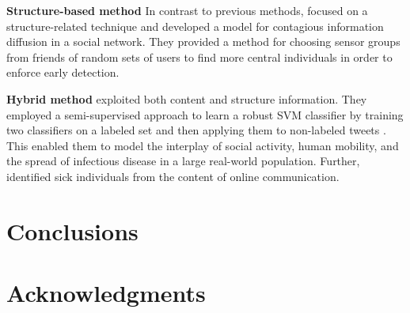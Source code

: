 \documentclass{acm_proc_article-sp}
\begin{document}
\begin{itemize}
\textbf{Structure-based method} In contrast to previous methods, \cite{garcia} focused on a structure-related technique and developed a model for contagious information diffusion in a social network. They provided a method for choosing sensor groups from friends of random sets of users to find more central individuals in order to enforce early detection.

\textbf{Hybrid method} \cite{sadilek} exploited both content and structure information. They employed a semi-supervised approach to learn a robust SVM classifier by training two classifiers on a labeled set and then applying them to non-labeled tweets . This enabled them to model the interplay of social activity, human mobility, and the spread of infectious disease in a large real-world population. Further, \cite{sadelik} identified sick individuals from the content of online communication. 
\end{itemize}
\section{Conclusions}


\section{Acknowledgments}
\cite{cuiZhang}





\balancecolumns
\end{document}
